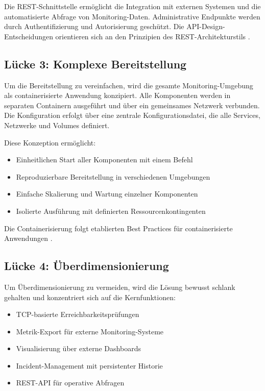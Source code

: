 Die REST-Schnittstelle ermöglicht die Integration mit externen Systemen und die automatisierte Abfrage von Monitoring-Daten. Administrative Endpunkte werden durch Authentifizierung und Autorisierung geschützt. Die API-Design-Entscheidungen orientieren sich an den Prinzipien des REST-Architekturstils \cite{rest-architectural-style}.

\subsection{Lücke 3: Komplexe Bereitstellung}
\label{subsec:loesung-luecke-3}

Um die Bereitstellung zu vereinfachen, wird die gesamte Monitoring-Umgebung als containerisierte Anwendung konzipiert. Alle Komponenten werden in separaten Containern ausgeführt und über ein gemeinsames Netzwerk verbunden. Die Konfiguration erfolgt über eine zentrale Konfigurationsdatei, die alle Services, Netzwerke und Volumes definiert.

Diese Konzeption ermöglicht:

\begin{itemize}
    \item Einheitlichen Start aller Komponenten mit einem Befehl
    \item Reproduzierbare Bereitstellung in verschiedenen Umgebungen
    \item Einfache Skalierung und Wartung einzelner Komponenten
    \item Isolierte Ausführung mit definierten Ressourcenkontingenten
\end{itemize}

Die Containerisierung folgt etablierten Best Practices für containerisierte Anwendungen \cite{docker-best-practices}.

\subsection{Lücke 4: Überdimensionierung}
\label{subsec:loesung-luecke-4}

Um Überdimensionierung zu vermeiden, wird die Lösung bewusst schlank gehalten und konzentriert sich auf die Kernfunktionen:

\begin{itemize}
    \item TCP-basierte Erreichbarkeitsprüfungen
    \item Metrik-Export für externe Monitoring-Systeme
    \item Visualisierung über externe Dashboards
    \item Incident-Management mit persistenter Historie
    \item REST-API für operative Abfragen
\end{itemize}

